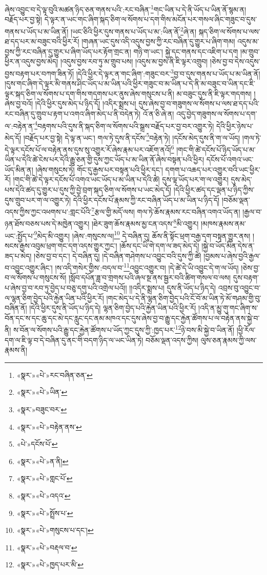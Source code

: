 ཞེས་འབྱུང་བ་དེ་ལྟ་བུའི་མཚན་ཉིད་ཅན་གནས་པའི་:རང་བཞིན་\footnote{«སྣར་»«པེ་»རང་བཞིན་ཅན་}གང་ཡིན་པ་དེ་ནི་ཡོད་པ་ཡིན་ནོ་སྙམ་ན། བརྗོད་པར་བྱ་སྟེ། དེ་ལྟར་ན་ཡང་གང་ཞིག་སྐད་ཅིག་ལ་སོགས་པ་དག་གིས་མངོན་པར་གསལ་ཞིང་གཟུང་བ་དུས་གནས་པ་ཡོད་པ་མ་ཡིན་ནོ། །ཡང་ཅིའི་ཕྱིར་དུས་གནས་པ་ཡོད་པ་མ་:ཡིན་ནོ་\footnote{«སྣར་»«པེ་»ཡིན་}ཞེ་ན། སྐད་ཅིག་ལ་སོགས་པ་ལས་ཐ་དད་པར་མ་བཟུང་བའི་ཕྱིར་རོ། །གཞན་ཡང་དུས་འདི་འདུས་བྱས་ཀྱི་རང་བཞིན་དུ་གྱུར་པ་ཞིག་གམ། འདུས་མ་བྱས་ཀྱི་རང་བཞིན་དུ་གྱུར་པ་ཞིག་ཡོད་པར་རྟོག་གྲང་ན། གཉི་ག་ཡང་། སྐྱེ་དང་གནས་དང་འཇིག་པ་དག །མ་གྲུབ་ཕྱིར་ན་འདུས་བྱས་མེད། །འདུས་བྱས་རབ་ཏུ་མ་གྲུབ་པས། །འདུས་མ་བྱས་ནི་ཇི་ལྟར་འགྲུབ། །ཅེས་བྱ་བ་དེས་འདུས་བྱས་བརྟག་པར་བཀག་ཟིན་ཏོ། །དེའི་ཕྱིར་དེ་ལྟར་ན་གང་ཞིག་:གཟུང་བར་\footnote{«སྣར་»བཟུང་བར་}བྱ་བ་དུས་གནས་པ་ཡོད་པ་མ་ཡིན་ནོ། །དུས་གང་ཞིག་དེ་ལྟར་མི་གནས་ཤིང་ཡོད་པ་མ་ཡིན་པའི་ཕྱིར་གཟུང་བ་མ་ཡིན་པ་དེ་ནི་མ་བཟུང་བ་ཡིན་དང་ཇི་ལྟར་སྐད་ཅིག་ལ་སོགས་པ་དག་གིས་གདགས་པར་ནུས་ཞེས་གསུངས་པ་ནི། མ་བཟུང་དུས་ནི་ཇི་ལྟར་གདགས། །ཞེས་བྱ་བའོ། །དེའི་ཕྱིར་དུས་མེད་པ་ཉིད་དོ། །འདིར་སྨྲས་པ། དུས་ཞེས་བྱ་བ་གཟུགས་ལ་སོགས་པ་ལས་ཐ་དད་པའི་རང་བཞིན་དུ་གྲུབ་པ་རྟག་པ་འགའ་ཞིག་མེད་པ་ནི་བདེན་ཏེ། འོ་ན་ཅི་ཞེ་ན། འདུ་བྱེད་གཟུགས་ལ་སོགས་པ་དག་ལ་:བརྟེན་ན་\footnote{«སྣར་»«པེ་»བརྟེན་ནས་}བརྟགས་པའི་དུས་ནི་སྐད་ཅིག་ལ་སོགས་པའི་སྒྲས་བརྗོད་པར་བྱ་བར་འགྱུར་ཏེ། དེའི་ཕྱིར་ཉེས་པ་མེད་དོ། །བརྗོད་པར་བྱ་སྟེ། དེ་ལྟ་ན་ཡང་། གལ་ཏེ་དུས་ནི་དངོས་\footnote{«པེ་»དངོས་པོ་}བརྟེན་ཏེ། །དངོས་མེད་དུས་ནི་ག་ལ་ཡོད། །གལ་ཏེ་དེ་ལྟར་དངོས་པོ་ལ་བརྟེན་ནས་དུས་སུ་འགྱུར་རོ་ཞེས་རྣམ་པར་འཇོག་ནའོ།\footnote{«སྣར་»«པེ་»ན་ནི།} །གང་གི་ཚེ་དངོས་པོ་ཉིད་ཡོད་པ་མ་ཡིན་པ་དེའི་ཚེ་ངེས་པར་དེའི་རྒྱུ་ཅན་གྱི་དུས་ཀྱང་ཡོད་པ་མ་ཡིན་ནོ་ཞེས་བསྟན་པའི་ཕྱིར། དངོས་པོ་འགའ་ཡང་ཡོད་མིན་ན། །ཞེས་གསུངས་ཏེ། གོང་དུ་རྒྱས་པར་བསྟན་པའི་ཕྱིར་དང་། དགག་པ་འཆད་པར་འགྱུར་བའི་ཡང་ཕྱིར་རོ། །གང་གི་ཚེ་དེ་ལྟར་དངོས་པོ་འགའ་ཡང་ཡོད་པ་མ་ཡིན་པ་དེའི་ཚེ། དུས་ལྟ་ཡོད་པར་ག་ལ་འགྱུར། དུས་མེད་པས་དེའི་ཚད་དུ་གྱུར་པ་དུས་ཀྱི་བྱེ་བྲག་སྐད་ཅིག་ལ་སོགས་པ་ཡང་མེད་དོ། །དེའི་ཕྱིར་ཚད་དང་ལྡན་པ་ཉིད་ཀྱིས་དུས་གྲུབ་པར་ག་ལ་འགྱུར་ཏེ། དེའི་ཕྱིར་དངོས་པོ་རྣམས་ཀྱི་རང་བཞིན་ཡོད་པ་མ་ཡིན་པ་ཉིད་དོ། །བཅོམ་ལྡན་འདས་ཀྱིས་ཀྱང་འཕགས་པ་:གླང་པོའི་\footnote{«སྣར་»«པེ་»གླང་པོ་}རྩལ་གྱི་མདོ་ལས། གལ་ཏེ་ཆོས་རྣམས་རང་བཞིན་འགའ་ཡོད་ན། །རྒྱལ་བ་ཉན་ཐོས་བཅས་པས་དེ་མཁྱེན་འགྱུར། །ཐེར་ཟུག་ཆོས་རྣམས་མྱ་ངན་འདས་\footnote{«སྣར་»«པེ་»འདའ་}མི་འགྱུར། །མཁས་རྣམས་ནམ་ཡང་:སྤྱོད་པ་\footnote{«སྣར་»«པེ་»སྤྲོས་པ་}མེད་མི་འགྱུར། །ཞེས་:གསུངས་ལ།\footnote{«སྣར་»«པེ་»གསུངས་པ་དང་།} དེ་བཞིན་དུ། ཆོས་ནི་སྟོང་ཕྲག་བརྒྱ་དག་བསྟན་གྱུར་ནས། །སངས་རྒྱས་འབུམ་ཕྲག་གང་དག་འདས་གྱུར་ཀྱང་། །ཆོས་དང་ཡི་གེ་དག་ལ་ཟད་མེད་དེ། །སྐྱེ་བ་ཡོད་མིན་དེས་ན་ཟད་པ་མེད། །ཅེས་བྱ་བ་དང་། དེ་བཞིན་དུ། །དེ་བཞིན་གཤེགས་པ་འབྱུང་བའི་དུས་ཀྱི་ཚེ། །བྱམས་པ་ཞེས་བྱའི་རྒྱལ་བ་འབྱུང་འགྱུར་ཞིང་། །ས་འདི་གསེར་གྱིས་:བདལ་བ་\footnote{«སྣར་»«པེ་»བརྡལ་བ་}འབྱུང་འགྱུར་བ། །དེ་ཚེ་དེ་ཡི་འབྱུང་དེ་ག་ལ་ཡོད། །ཅེས་བྱ་བ་ལ་སོགས་པ་གསུངས་སོ། །སློབ་དཔོན་ཟླ་བ་གྲགས་པའི་ཞལ་སྔ་ནས་སྦྱར་བའི་ཚིག་གསལ་བ་ལས། དུས་བརྟག་པ་ཞེས་བྱ་བ་རབ་ཏུ་བྱེད་པ་བཅུ་དགུ་པའི་འགྲེལ་པའོ།། །།འདིར་སྨྲས་པ། དུས་ནི་ཡོད་པ་ཉིད་དེ། འབྲས་བུ་འབྱུང་བ་ལ་ལྷན་ཅིག་བྱེད་པའི་རྐྱེན་ཡིན་པའི་ཕྱིར་རོ། །གང་མེད་པ་དེ་ནི་ལྷན་ཅིག་བྱེད་པའི་ངོ་བོ་མ་ཡིན་ཏེ་མོ་གཤམ་གྱི་བུ་བཞིན་ནོ། །དེའི་ཕྱིར་དུས་ནི་ཡོད་པ་ཉིད་དེ། ལྷན་ཅིག་བྱེད་པའི་རྐྱེན་ཡིན་པའི་ཕྱིར་རོ། །འདི་ན་མྱུ་གུ་གང་ཞིག་ས་བོན་དང་ས་དང་ཆུ་དང་མེ་དང་རླུང་དང་ནམ་མཁའ་དང་དུས་ཞེས་བྱ་བ་རྒྱུ་དང་རྐྱེན་ཚོགས་པ་ལ་བརྟེན་ནས་སྐྱེ་བ་ནི། ས་བོན་ལ་སོགས་པའི་རྒྱུ་དང་རྐྱེན་ཚོགས་པ་ཡོད་ཀྱང་དུས་ཀྱི་:ཁྱད་པར་\footnote{«སྣར་»«པེ་»ཁྱད་པར་མི་}ཉེ་བས་མི་སྐྱེ་བ་ཡིན་ནོ། །ཕྱི་རོལ་དག་ལ་ཇི་ལྟ་བ་དེ་བཞིན་དུ་ནང་གི་བདག་ཉིད་ལ་ཡང་ཡིན་ཏེ། བཅོམ་ལྡན་འདས་ཀྱིས། ལུས་ཅན་རྣམས་ཀྱི་ལས་རྣམས་ནི། 